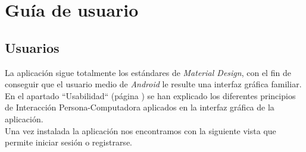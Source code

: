 \documentclass[twoside]{report}
\begin{document}
\section{Guía de usuario}

\subsection{Usuarios}


La aplicación sigue totalmente los estándares de \textit{Material Design}, con el fin de conseguir que el usuario medio de \textit{Android} le resulte una interfaz gráfica familiar. En el apartado “Usabilidad“ (página \pageref{usabilitymatters}) se han explicado los diferentes principios de Interacción Persona-Computadora aplicados en la interfaz gráfica de la aplicación.\\

Una vez instalada la aplicación nos encontramos con la siguiente vista que permite iniciar sesión o registrarse.
\end{document}
